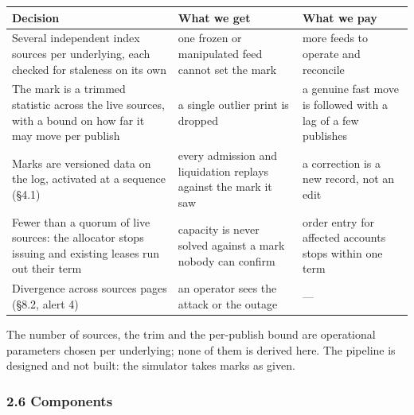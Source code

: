 \documentclass[10pt,a4paper]{article}
\newcounter{none}  %
\begin{document}
{\def\LTcaptype{none} %
\begin{longtable}[]{@{}
  >{\raggedright\arraybackslash}p{}
  >{\raggedright\arraybackslash}p{}
  >{\raggedright\arraybackslash}p{}@{}}
\toprule\noalign{}
\begin{minipage}[b]{\linewidth}\raggedright
Decision
\end{minipage} & \begin{minipage}[b]{\linewidth}\raggedright
What we get
\end{minipage} & \begin{minipage}[b]{\linewidth}\raggedright
What we pay
\end{minipage} \\
\midrule\noalign{}
\endhead
\bottomrule\noalign{}
\endlastfoot
Several independent index sources per underlying, each checked for staleness on its own & one frozen or manipulated feed cannot set the mark & more feeds to operate and reconcile \\
The mark is a trimmed statistic across the live sources, with a bound on how far it may move per publish & a single outlier print is dropped & a genuine fast move is followed with a lag of a few publishes \\
Marks are versioned data on the log, activated at a sequence (§4.1) & every admission and liquidation replays against the mark it saw & a correction is a new record, not an edit \\
Fewer than a quorum of live sources: the allocator stops issuing and existing leases run out their term & capacity is never solved against a mark nobody can confirm & order entry for affected accounts stops within one term \\
Divergence across sources pages (§8.2, alert 4) & an operator sees the attack or the outage & --- \\
\end{longtable}
}

The number of sources, the trim and the per-publish bound are operational
parameters chosen per underlying; none of them is derived here. The pipeline is
designed and not built: the simulator takes marks as given.

\subsubsection{2.6 Components}\label{components}
\end{document}

